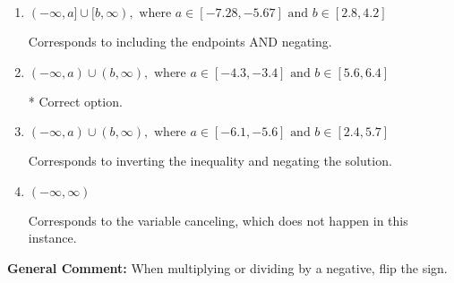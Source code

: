 \documentclass{extbook}[14pt]
\begin{document}
\begin{enumerate}
{\begin{enumerate}[label=\Alph*.]
Corresponds to including the endpoints (when they should be excluded).
\item \( (-\infty, a] \cup [b, \infty), \text{ where } a \in [-7.28, -5.67] \text{ and } b \in [2.8, 4.2] \)

Corresponds to including the endpoints AND negating.
\item \( (-\infty, a) \cup (b, \infty), \text{ where } a \in [-4.3, -3.4] \text{ and } b \in [5.6, 6.4] \)

 * Correct option.
\item \( (-\infty, a) \cup (b, \infty), \text{ where } a \in [-6.1, -5.6] \text{ and } b \in [2.4, 5.7] \)

Corresponds to inverting the inequality and negating the solution.
\item \( (-\infty, \infty) \)

Corresponds to the variable canceling, which does not happen in this instance.
\end{enumerate}

\textbf{General Comment:} When multiplying or dividing by a negative, flip the sign.
}
\end{enumerate}
\end{document}
